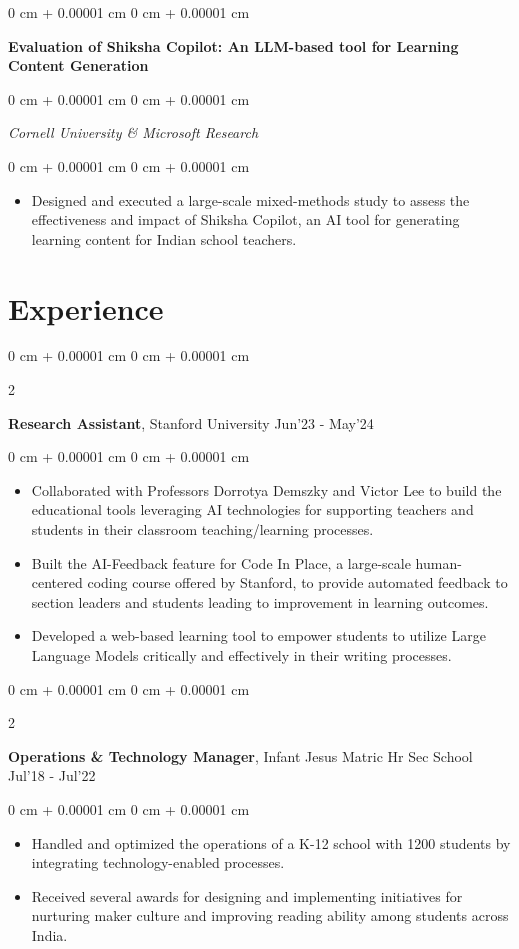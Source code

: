 \documentclass[10pt, letterpaper]{article}
\newenvironment{highlights}{
    \begin{itemize}[
        topsep=0.10 cm,
        parsep=0.10 cm,
        partopsep=0pt,
        itemsep=0pt,
        leftmargin=0 cm + 10pt
    ]
}{
    \end{itemize}
} %
\newenvironment{onecolentry}{
    \begin{adjustwidth}{
        0 cm + 0.00001 cm
    }{
        0 cm + 0.00001 cm
    }
}{
    \end{adjustwidth}
} %
\newenvironment{twocolentry}[2][]{
    \onecolentry
    \def\secondColumn{#2}
    \setcolumnwidth{\fill, 4.5 cm}
    \begin{paracol}{2}
}{
    \switchcolumn \raggedleft \secondColumn
    \end{paracol}
    \endonecolentry
} %
\newcommand{\datetext}[1]{\color{gray800}#1}
\newcommand{\experienceentry}[3]{
    \begin{twocolentry}{
        \datetext{#3}
    }
        \textbf{#1}, #2\end{twocolentry}

    \vspace{0.10 cm}
}
\newcommand{\researchprojectentry}[2]{
    \begin{onecolentry}
        \textbf{#1}
    \end{onecolentry}
    \vspace{0.06cm}
    \begin{onecolentry}
        \textit{#2}
    \end{onecolentry}
    \vspace{0.10cm}
}
\newcommand{\itemspacing}[1]{\vspace{0.275 cm}#1}
\begin{document}
        
        \researchprojectentry{Evaluation of Shiksha Copilot: An LLM-based tool for Learning Content Generation}{Cornell University \& Microsoft Research}
            \begin{onecolentry}
                \begin{highlights}
                    \item Designed and executed a large-scale mixed-methods study to assess the effectiveness and impact of Shiksha Copilot, an AI tool for generating learning content for Indian school teachers.
                \end{highlights}
            \end{onecolentry}

    \section{Experience}
        \experienceentry{Research Assistant}{Stanford University}{Jun'23 - May'24}
        \begin{onecolentry}
            \begin{highlights}
                \item Collaborated with Professors Dorrotya Demszky and Victor Lee to build the educational tools leveraging AI technologies for supporting teachers and students in their classroom teaching/learning processes.
                \item Built the AI-Feedback feature for Code In Place, a large-scale human-centered coding course offered by Stanford, to provide automated feedback to section leaders and students leading to improvement in learning outcomes.
                \item Developed a web-based learning tool to empower students to utilize Large Language Models critically and effectively in their writing processes.
            \end{highlights}
        \end{onecolentry}

        \itemspacing

        \experienceentry{Operations \& Technology Manager}{Infant Jesus Matric Hr Sec School}{Jul'18 - Jul'22}
        \begin{onecolentry}
            \begin{highlights}
                \item Handled and optimized the operations of a K-12 school with 1200 students by integrating technology-enabled processes.
                \item Received several awards for designing and implementing initiatives for nurturing maker culture and improving reading ability among students across India. 
            \end{highlights}
        \end{onecolentry}
        
\end{document}
